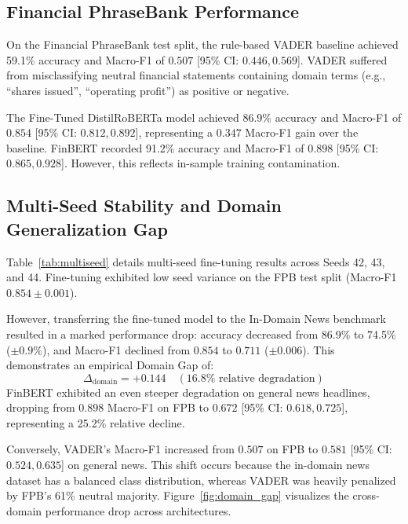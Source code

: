 \documentclass[10pt,twocolumn,letterpaper]{article}
\begin{document}
\subsection{Financial PhraseBank Performance}
On the Financial PhraseBank test split, the rule-based VADER baseline achieved 59.1\% accuracy and Macro-F1 of $0.507$ [95\% CI: $0.446, 0.569$]. VADER suffered from misclassifying neutral financial statements containing domain terms (e.g., ``shares issued'', ``operating profit'') as positive or negative.

The Fine-Tuned DistilRoBERTa model achieved 86.9\% accuracy and Macro-F1 of $0.854$ [95\% CI: $0.812, 0.892$], representing a $0.347$ Macro-F1 gain over the baseline. FinBERT recorded 91.2\% accuracy and Macro-F1 of $0.898$ [95\% CI: $0.865, 0.928$]. However, this reflects in-sample training contamination.



\subsection{Multi-Seed Stability and Domain Generalization Gap}
Table~\ref{tab:multiseed} details multi-seed fine-tuning results across Seeds 42, 43, and 44. Fine-tuning exhibited low seed variance on the FPB test split (Macro-F1 $0.854 \pm 0.001$).

However, transferring the fine-tuned model to the In-Domain News benchmark resulted in a marked performance drop: accuracy decreased from 86.9\% to 74.5\% ($\pm 0.9\%$), and Macro-F1 declined from $0.854$ to $0.711$ ($\pm 0.006$). This demonstrates an empirical Domain Gap of:
\begin{equation}
    \Delta_{\text{domain}} = +0.144 \quad (16.8\%\text{ relative degradation})
\end{equation}
FinBERT exhibited an even steeper degradation on general news headlines, dropping from $0.898$ Macro-F1 on FPB to $0.672$ [95\% CI: $0.618, 0.725$], representing a 25.2\% relative decline.

Conversely, VADER's Macro-F1 increased from $0.507$ on FPB to $0.581$ [95\% CI: $0.524, 0.635$] on general news. This shift occurs because the in-domain news dataset has a balanced class distribution, whereas VADER was heavily penalized by FPB's 61\% neutral majority. Figure~\ref{fig:domain_gap} visualizes the cross-domain performance drop across architectures.


\end{document}
